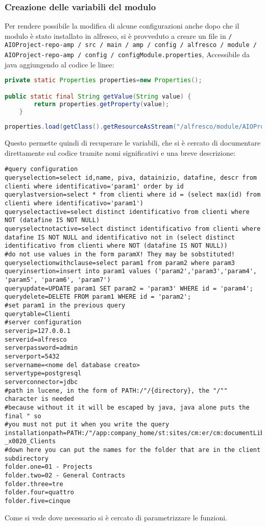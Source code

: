\subsubsection{Creazione delle variabili del modulo}
Per rendere possibile la modifica di alcune configurazioni anche dopo che il modulo è stato installato in alfresco, si è provveduto a creare un file in \texttt{/ AIOProject-repo-amp / src / main / amp / config / alfresco / module / AIOProject-repo-amp / config / configModule.properties}, Accessibile da java aggiungendo al codice le linee:
\begin{lstlisting}[language=Java]
private static Properties properties=new Properties();

public static final String getValue(String value) {
		return properties.getProperty(value);
	}
	
properties.load(getClass().getResourceAsStream("/alfresco/module/AIOProject-repo-amp/config/configModule.properties"));
\end{lstlisting}
Questo permette quindi di recuperare le variabili, che si è cercato di documentare direttamente sul codice tramite nomi significativi e una breve descrizione:
\begin{lstlisting}
#query configuration
queryselection=select id,name, piva, datainizio, datafine, descr from clienti where identificativo='param1' order by id
querylastversion=select * from clienti where id = (select max(id) from clienti where identificativo='param1')
queryselectactive=select distinct identificativo from clienti where NOT (datafine IS NOT NULL)
queryselectnotactive=select distinct identificativo from clienti where datafine IS NOT NULL and identificativo not in (select distinct identificativo from clienti where NOT (datafine IS NOT NULL))
#do not use values in the form paramX! They may be sobstituted!
queryselectionwithclause=select param1 from param2 where param3
queryinsertion=insert into param1 values ('param2','param3','param4', 'param5', 'param6', 'param7')
queryupdate=UPDATE param1 SET param2 = 'param3' WHERE id = 'param4';
querydelete=DELETE FROM param1 WHERE id = 'param2';
#set param1 in the previous query
querytable=Clienti
#server configuration
serverip=127.0.0.1
serverid=alfresco
serverpassword=admin
serverport=5432
servername=<nome del database creato>
servertype=postgresql
serverconnector=jdbc
#path in lucene, in the form of PATH:/"/{directory}, the "/"" character is needed 
#because without it it will be escaped by java, java alone puts the final " so 
#you must not put it when you write the query
installationpath=PATH:/"/app:company_home/st:sites/cm:er/cm:documentLibrary/cm:_x0030_2_x0020_-_x0020_Clients
#down here you can put the names for the folder that are in the client subdirectory
folder.one=01 - Projects
folder.two=02 - General Contracts
folder.three=tre
folder.four=quattro
folder.five=cinque
\end{lstlisting}
Come si vede dove necessario si è cercato di parametrizzare le funzioni.


